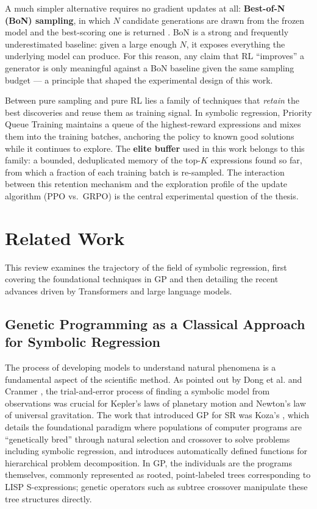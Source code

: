 A much simpler alternative requires no gradient updates at all: \textbf{Best-of-N (BoN) sampling}, in which $N$ candidate generations are drawn from the frozen model and the best-scoring one is returned \cite{stiennon2020learning}. BoN is a strong and frequently underestimated baseline: given a large enough $N$, it exposes everything the underlying model can produce. For this reason, any claim that RL ``improves'' a generator is only meaningful against a BoN baseline given the same sampling budget --- a principle that shaped the experimental design of this work.

Between pure sampling and pure RL lies a family of techniques that \emph{retain} the best discoveries and reuse them as training signal. In symbolic regression, Priority Queue Training \cite{petersen2020deep} maintains a queue of the highest-reward expressions and mixes them into the training batches, anchoring the policy to known good solutions while it continues to explore. The \textbf{elite buffer} used in this work belongs to this family: a bounded, deduplicated memory of the top-$K$ expressions found so far, from which a fraction of each training batch is re-sampled. The interaction between this retention mechanism and the exploration profile of the update algorithm (PPO vs.\ GRPO) is the central experimental question of the thesis.

\section{Related Work}

This review examines the trajectory of the field of symbolic regression, first covering the foundational techniques in GP and then detailing the recent advances driven by Transformers and large language models.

\subsection{Genetic Programming as a Classical Approach for Symbolic Regression}

The process of developing models to understand natural phenomena is a fundamental aspect of the scientific method. As pointed out by Dong et al. \cite{dong2025RecentAdvances} and Cranmer \cite{cranmer2023interpretable}, the trial-and-error process of finding a symbolic model from observations was crucial for Kepler's laws of planetary motion and Newton's law of universal gravitation. The work that introduced GP for SR was Koza's \cite{Koza1992}, which details the foundational paradigm where populations of computer programs are ``genetically bred'' through natural selection and crossover to solve problems including symbolic regression, and introduces automatically defined functions for hierarchical problem decomposition. In GP, the individuals are the programs themselves, commonly represented as rooted, point-labeled trees corresponding to LISP S-expressions; genetic operators such as subtree crossover manipulate these tree structures directly.

